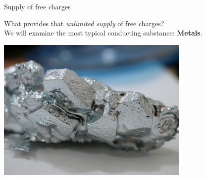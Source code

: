 \begin{frame}{Supply of free charges}

What provides that {\em unlimited supply} of free charges?\\
We will examine the most typical conducting substance: {\bf Metals}.\\

\begin{center}
   \includegraphics[width=0.70\textwidth]{./images/photos/gallium_crystals.jpg}
\end{center}

\end{frame}

%
%
%

